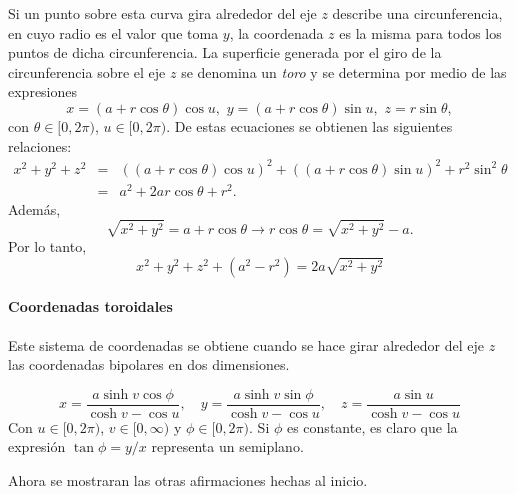 Si un punto sobre esta curva gira alrededor del eje $z$ describe una circunferencia, en
cuyo radio es el valor que toma $y$, la coordenada $z$ es la misma para
todos los puntos de dicha circunferencia.
La superficie generada por el giro de la circunferencia sobre el eje $z$ se denomina  un \emph{toro}
y se determina por medio de las expresiones 
\[x = \left( a+r\cos \theta \right) \cos u,\,\, y = \left( a+r\cos \theta \right) \sin u,\,\, z = r\sin \theta,\]
con $\theta \in \lbrack 0,2\pi )$, $u\in \lbrack 0,2\pi)$.
De estas ecuaciones se obtienen las siguientes relaciones:
\begin{eqnarray*}
x^{2}+y^{2}+z^{2} &=& \left( \left(a+r\cos\theta \right)\cos u\right)^{2}+
\left(\left(a+r\cos\theta\right)\sin u\right) ^{2}+r^{2}\sin^{2}\theta \\ &=& a^{2}+2ar\cos \theta +r^{2}.
\end{eqnarray*}
Además,
\[\sqrt{x^{2}+y^{2}}=a+r\cos \theta \rightarrow r\cos \theta =\sqrt{x^{2}+y^{2}}-a.\]
Por lo tanto,
\begin{equation} \label{toroidales3}
x^{2}+y^{2}+z^{2}+(a^{2}-r^{2})= 2a\sqrt{x^{2}+y^{2}}
\end{equation}

\paragraph*{Coordenadas toroidales} 

Este sistema de coordenadas se obtiene cuando se hace girar alrededor del eje $z$
las coordenadas bipolares en dos dimensiones.

\begin{equation}
x = \frac{a\sinh v\cos \phi }{\cosh v-\cos u},\quad y =\frac{a\sinh v\sin \phi }{\cosh v-\cos u}, \quad z = \frac{a\sin u}{\cosh v-\cos u}
\end{equation}
Con $u\in [0,2\pi )$, $v\in [0,\infty )$ y $\phi \in [0,2\pi )$.
Si $\phi $ es constante, es claro que la expresión $\tan \phi =y/x$ representa un semiplano.

Ahora se mostraran las otras afirmaciones hechas al inicio.

